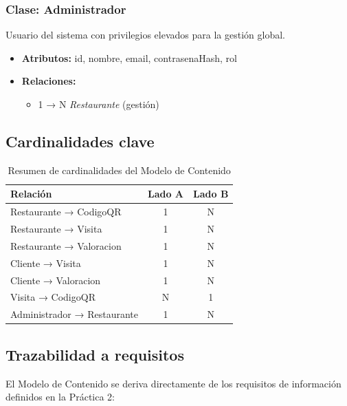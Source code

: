 \subsubsection{Clase: Administrador}
Usuario del sistema con privilegios elevados para la gestión global.

\begin{itemize}
    \item \textbf{Atributos:} id, nombre, email, contrasenaHash, rol
    \item \textbf{Relaciones:}
    \begin{itemize}
        \item 1 → N \textit{Restaurante} (gestión)
    \end{itemize}
\end{itemize}

\subsection{Cardinalidades clave}

\begin{table}[H]
    \centering
    \caption{Resumen de cardinalidades del Modelo de Contenido}
    \label{tab:cardinalidades}
    \begin{tabular}{|l|c|c|}
        \hline
        \textbf{Relación} & \textbf{Lado A} & \textbf{Lado B} \\
        \hline
        Restaurante → CodigoQR & 1 & N \\
        Restaurante → Visita & 1 & N \\
        Restaurante → Valoracion & 1 & N \\
        Cliente → Visita & 1 & N \\
        Cliente → Valoracion & 1 & N \\
        Visita → CodigoQR & N & 1 \\
        Administrador → Restaurante & 1 & N \\
        \hline
    \end{tabular}
\end{table}

\subsection{Trazabilidad a requisitos}

El Modelo de Contenido se deriva directamente de los requisitos de información definidos en la Práctica 2:

